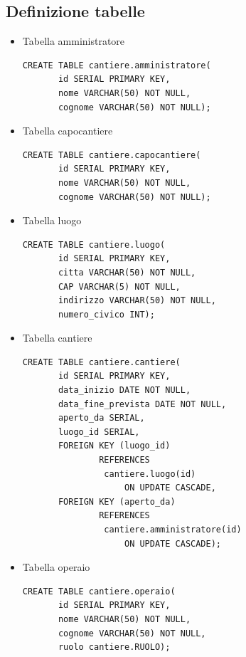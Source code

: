 \documentclass[11pt]{article}
\begin{document}
\subsection*{Definizione tabelle}
\label{sec:org4d2f052}
\begin{itemize}
\item Tabella amministratore
\label{sec:orgc811e33}
\begin{verbatim}
CREATE TABLE cantiere.amministratore(
       id SERIAL PRIMARY KEY,
       nome VARCHAR(50) NOT NULL,
       cognome VARCHAR(50) NOT NULL);
\end{verbatim}
\item Tabella capocantiere
\label{sec:org41da6fd}
\begin{verbatim}
CREATE TABLE cantiere.capocantiere(
       id SERIAL PRIMARY KEY,
       nome VARCHAR(50) NOT NULL,
       cognome VARCHAR(50) NOT NULL);
\end{verbatim}
\item Tabella luogo
\label{sec:orgd893d71}
\begin{verbatim}
CREATE TABLE cantiere.luogo(
       id SERIAL PRIMARY KEY,
       citta VARCHAR(50) NOT NULL,
       CAP VARCHAR(5) NOT NULL,
       indirizzo VARCHAR(50) NOT NULL,
       numero_civico INT);
\end{verbatim}
\item Tabella cantiere
\label{sec:org9c8abad}
\begin{verbatim}
CREATE TABLE cantiere.cantiere(
       id SERIAL PRIMARY KEY,
       data_inizio DATE NOT NULL,
       data_fine_prevista DATE NOT NULL,
       aperto_da SERIAL,
       luogo_id SERIAL,
       FOREIGN KEY (luogo_id)
               REFERENCES
                cantiere.luogo(id)
                    ON UPDATE CASCADE,
       FOREIGN KEY (aperto_da)
               REFERENCES
                cantiere.amministratore(id)
                    ON UPDATE CASCADE);
\end{verbatim}
\item Tabella operaio
\label{sec:org73dda9f}
\begin{verbatim}
CREATE TABLE cantiere.operaio(
       id SERIAL PRIMARY KEY,
       nome VARCHAR(50) NOT NULL,
       cognome VARCHAR(50) NOT NULL,
       ruolo cantiere.RUOLO);


\end{verbatim}
\end{itemize}
\end{document}
